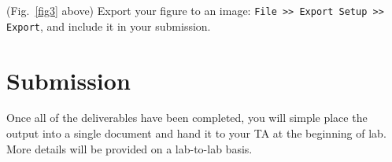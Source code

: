 \documentclass[11pt, letterpaper]{article}
\begin{document}
\begin{formal}
    \begin{deliv}  (Fig.~\ref{fig3} above) 
   Export your figure to an image: \texttt{File >> Export Setup >> Export}, and include it in your submission.
    \end{deliv}
\end{formal}


\section*{Submission}

Once all of the deliverables have been completed, you will simple place the output into a single document and hand it to your TA at the beginning of lab. More details will be provided on a lab-to-lab basis.
\end{document}
